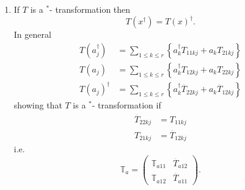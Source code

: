 \documentclass[aps, preprint]{revtex4}
\begin{document}
\begin{enumerate}
\item If $T$ is a $^{ \ast }$- transformation then
\begin{equation}T (x^{ \dag }) =T (x)^{ \dag }\text{.}
\end{equation}In general
\begin{align}T \left (a_{j}^{ \dag }\right ) &  =\sum _{1 \leq k \leq r}\left \{a_{k}^{ \dag } T_{1 1 k j} +a_{k} T_{2 1 k j}\right \} \\
T \left (a_{j}\right ) &  =\sum _{1 \leq k \leq r}\left \{a_{k}^{ \dag } T_{1 2 k j} +a_{k} T_{2 2 k j}\right \} \\
T \left (a_{j}\right )^{ \dag } &  =\sum _{1 \leq k \leq r}\left \{a_{k}^{ \dag } \overset{\underline{}}{T}_{2 2 k j} +a_{k} \overset{\underline{}}{T}_{1 2 k j}\right \}\end{align}showing that $T$ is a $^{ \ast }$- transformation if
\begin{align}\overset{\underline{}}{T}_{2 2 k j} &  =T_{1 1 k j} \\
T_{2 1 k j} &  =\overset{\underline{}}{T}_{1 2 k j}\end{align}i.e.
\begin{equation}\mathbb{T}_{a} =\left (\begin{array}{cc}\mathbb{T}_{a 1 1} & \overset{\underline{}}{T}_{a 1 2} \\
\mathbb{T}_{a 1 2} & \overset{\underline{}}{T}_{a 1 1}\end{array}\right )\text{.}
\end{equation}


\end{enumerate}
\end{document}

